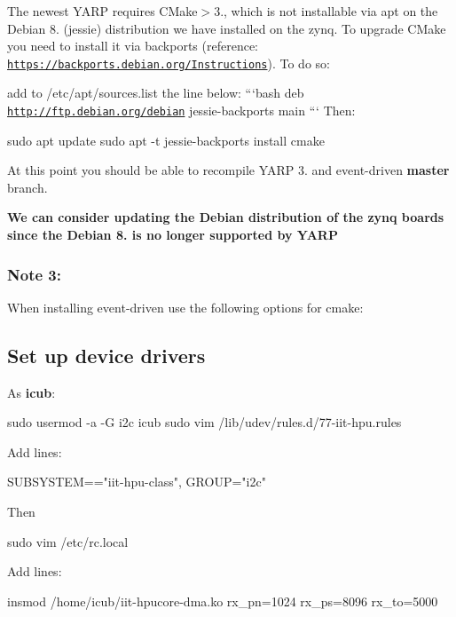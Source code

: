 The newest Y\+A\+RP requires C\+Make$>$3., which is not installable via {\ttfamily apt} on the Debian 8. (jessie) distribution we have installed on the zynq. To upgrade C\+Make you need to install it via backports (reference\+: \href{https://backports.debian.org/Instructions}{\tt https\+://backports.\+debian.\+org/\+Instructions}). To do so\+:
\begin{DoxyItemize}
\item add to {\ttfamily /etc/apt/sources.list} the line below\+: ```bash deb \href{http://ftp.debian.org/debian}{\tt http\+://ftp.\+debian.\+org/debian} jessie-\/backports main ``` Then\+: 
\begin{DoxyCode}
sudo apt update
sudo apt -t jessie-backports install cmake
\end{DoxyCode}
 At this point you should be able to recompile Y\+A\+RP 3. and {\ttfamily event-\/driven} {\bfseries master} branch.
\end{DoxyItemize}

{\bfseries We can consider updating the Debian distribution of the zynq boards since the Debian 8. is no longer supported by Y\+A\+RP}

\subsubsection*{Note 3\+:}

When installing {\ttfamily event-\/driven} use the following options for cmake\+: 
 \subsection*{Set up device drivers}

As {\bfseries icub}\+: 
\begin{DoxyCode}
sudo usermod -a -G i2c icub
sudo vim /lib/udev/rules.d/77-iit-hpu.rules
\end{DoxyCode}
 Add lines\+: 
\begin{DoxyCode}
SUBSYSTEM=="iit-hpu-class", GROUP="i2c"
\end{DoxyCode}
 Then 
\begin{DoxyCode}
sudo vim /etc/rc.local
\end{DoxyCode}
 Add lines\+: 
\begin{DoxyCode}
insmod /home/icub/iit-hpucore-dma.ko rx\_pn=1024 rx\_ps=8096 rx\_to=5000
\end{DoxyCode}
